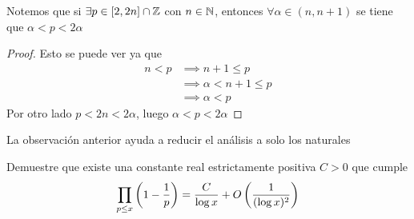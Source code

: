 \begin{sol}
	\begin{obs}
		Notemos que si $\exists p\in[2,2n]\cap\mathbb{Z}$ con $n\in\mathbb{N}$, entonces $\forall\alpha\in(n,n+1)$ se tiene que $\alpha<p<2\alpha$
		\begin{proof}
			Esto se puede ver ya que
			\begin{align*}
				n<p&\implies n+1\leq p\\
				&\implies\alpha<n+1\leq p\\
				&\implies\alpha<p
			\end{align*}
			Por otro lado $p<2n<2\alpha$, luego $\alpha<p<2\alpha$
		\end{proof}
	\end{obs}
	{\flushleft
	La observación anterior ayuda a reducir el análisis a solo los naturales}
	
\end{sol}

\begin{prob}[4 pts.]
	Demuestre que existe una constante real estrictamente positiva $C>0$ que cumple
	\[\prod_{p\leq x}\left(1-\frac{1}{p}\right)=\frac{C}{\log x}+O\left(\frac{1}{(\log x)^2}\right)\]
\end{prob}

\begin{sol}

\end{sol}


